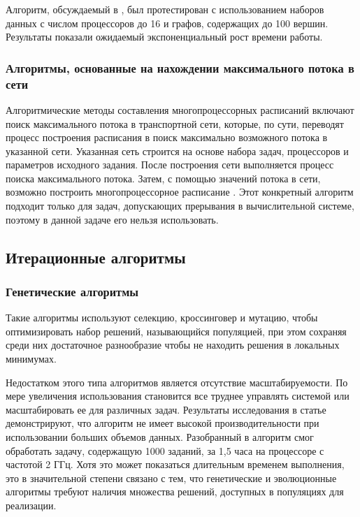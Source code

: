 Алгоритм, обсуждаемый в \cite{Rahman2009BranchAB}, был протестирован с использованием наборов данных с числом процессоров до 16 и графов, содержащих до 100 вершин. Результаты показали ожидаемый экспоненциальный рост времени работы.

\subsubsection{Алгоритмы, основанные на нахождении максимального потока в сети}

Алгоритмические методы составления многопроцессорных расписаний включают поиск максимального потока в транспортной сети, которые, по сути, переводят процесс построения расписания в поиск максимально возможного потока в указанной сети. Указанная сеть строится на основе набора задач, процессоров и параметров исходного задания. После построения сети выполняется процесс поиска максимального потока. Затем, с помощью значений потока в сети, возможно построить многопроцессорное расписание \cite{MAGIROU1989351}. Этот конкретный алгоритм подходит только для задач, допускающих прерывания в вычислительной системе, поэтому в данной задаче его нельзя использовать.

\subsection{Итерационные алгоритмы}

\subsubsection{Генетические алгоритмы}

Такие алгоритмы используют селекцию, кроссинговер и мутацию, чтобы оптимизировать набор решений, называющийся популяцией, при этом сохраняя среди них достаточное разнообразие чтобы не находить решения в локальных минимумах.

Недостатком этого типа алгоритмов является отсутствие масштабируемости. По мере увеличения использования становится все труднее управлять системой или масштабировать ее для различных задач. Результаты исследования в статье демонстрируют, что алгоритм не имеет высокой производительности при использовании больших объемов данных. Разобранный в \cite{Sheikh2016AnET} алгоритм смог обработать задачу, содержащую 1000 заданий, за 1,5 часа на процессоре с частотой 2 ГГц. Хотя это может показаться длительным временем выполнения, это в значительной степени связано с тем, что генетические и эволюционные алгоритмы требуют наличия множества решений, доступных в популяциях для реализации.

